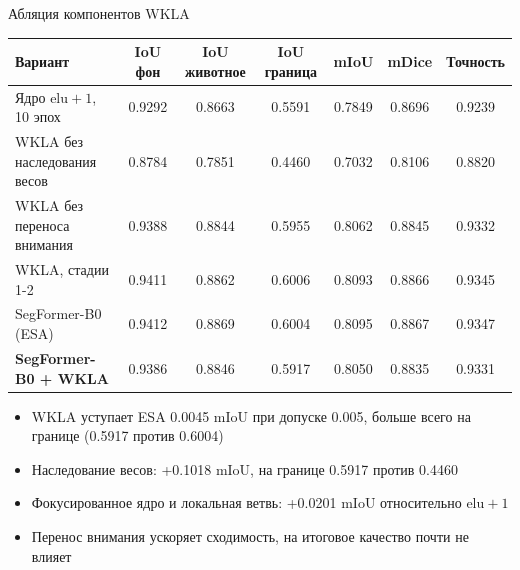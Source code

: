 \documentclass[aspectratio=169,xcolor=table]{beamer}
\newcommand{\best}[1]{\cellcolor{green!25}#1}
\newcommand{\worst}[1]{\cellcolor{red!25}#1}
\newcommand{\ours}{\textbf{SegFormer-B0 + WKLA}}
\begin{document}
\begin{frame}{Абляция компонентов WKLA}
  \footnotesize
  \begin{table}
    \centering
    \begin{tabular}{lcccccc}
      \toprule
      Вариант & IoU фон & IoU животное & IoU граница & mIoU & mDice & Точность \\
      \midrule
      Ядро $\mathrm{elu} + 1$, 10 эпох & 0.9292 & 0.8663 & 0.5591 & 0.7849 & 0.8696 & 0.9239 \\
      WKLA без наследования весов & \worst{0.8784} & \worst{0.7851} & \worst{0.4460} & \worst{0.7032} & \worst{0.8106} & \worst{0.8820} \\
      WKLA без переноса внимания & 0.9388 & 0.8844 & 0.5955 & 0.8062 & 0.8845 & 0.9332 \\
      WKLA, стадии 1-2 & 0.9411 & 0.8862 & \best{0.6006} & 0.8093 & 0.8866 & 0.9345 \\
      SegFormer-B0 (ESA) & \best{0.9412} & \best{0.8869} & 0.6004 & \best{0.8095} & \best{0.8867} & \best{0.9347} \\
      \ours & 0.9386 & 0.8846 & 0.5917 & 0.8050 & 0.8835 & 0.9331 \\
      \bottomrule
    \end{tabular}
  \end{table}
  \small
  \begin{itemize}
    \item WKLA уступает ESA 0.0045 mIoU при допуске 0.005, больше всего на границе (0.5917 против 0.6004)
    \item Наследование весов: +0.1018 mIoU, на границе 0.5917 против 0.4460
    \item Фокусированное ядро и локальная ветвь: +0.0201 mIoU относительно $\mathrm{elu} + 1$
    \item Перенос внимания ускоряет сходимость, на итоговое качество почти не влияет
  \end{itemize}
\end{frame}
\end{document}
